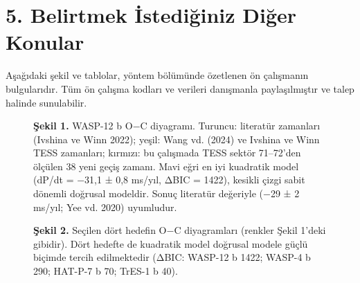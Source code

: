 \section*{5. Belirtmek İstediğiniz Diğer Konular}
Aşağıdaki şekil ve tablolar, yöntem bölümünde özetlenen ön çalışmanın bulgularıdır. Tüm ön çalışma kodları ve verileri danışmanla paylaşılmıştır ve talep halinde sunulabilir.

\begin{figure}[H]
\centering
{}
\caption*{\small \textbf{Şekil 1.} WASP-12 b O$-$C diyagramı. Turuncu: literatür zamanları (Ivshina ve Winn 2022); yeşil: Wang vd. (2024) ve Ivshina ve Winn TESS zamanları; kırmızı: bu çalışmada TESS sektör 71–72'den ölçülen 38 yeni geçiş zamanı. Mavi eğri en iyi kuadratik model (dP/dt = −31,1 ± 0,8 ms/yıl, ΔBIC = 1422), kesikli çizgi sabit dönemli doğrusal modeldir. Sonuç literatür değeriyle (−29 ± 2 ms/yıl; Yee vd. 2020) uyumludur.}
\end{figure}

\begin{figure}[H]
\centering
{}
\caption*{\small \textbf{Şekil 2.} Seçilen dört hedefin O$-$C diyagramları (renkler Şekil 1'deki gibidir). Dört hedefte de kuadratik model doğrusal modele güçlü biçimde tercih edilmektedir (ΔBIC: WASP-12 b 1422; WASP-4 b 290; HAT-P-7 b 70; TrES-1 b 40).}
\end{figure}


